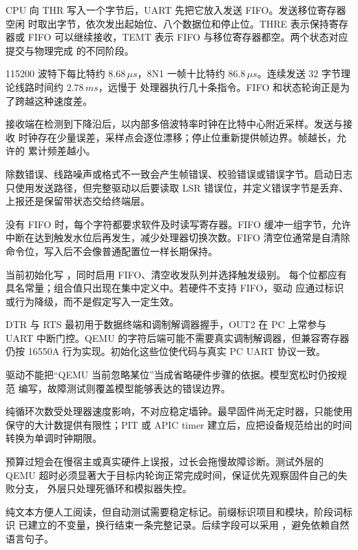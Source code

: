 
CPU 向 THR 写入一个字节后，UART 先把它放入发送 FIFO。发送移位寄存器空闲
时取出字节，依次发出起始位、八个数据位和停止位。THRE 表示保持寄存器或 FIFO
可以继续接收，TEMT 表示 FIFO 与移位寄存器都空。两个状态对应提交与物理完成
的不同阶段。

115200 波特下每比特约 \(8.68\,\mu s\)，8N1 一帧十比特约
\(86.8\,\mu s\)。连续发送 32 字节理论线路时间约 \(2.78\,ms\)，远慢于
处理器执行几十条指令。FIFO 和状态轮询正是为了跨越这种速度差。

接收端在检测到下降沿后，以内部多倍波特率时钟在比特中心附近采样。发送与接收
时钟存在少量误差，采样点会逐位漂移；停止位重新提供帧边界。帧越长，允许的
累计频差越小。

除数错误、线路噪声或格式不一致会产生帧错误、校验错误或错误字节。启动日志
只使用发送路径，但完整驱动以后要读取 LSR 错误位，并定义错误字节是丢弃、
上报还是保留带状态交给终端层。

没有 FIFO 时，每个字符都要求软件及时读写寄存器。FIFO 缓冲一组字节，允许
中断在达到触发水位后再发生，减少处理器切换次数。FIFO 清空位通常是自清除
命令位，写入后不会像普通配置位一样长期保持。

当前初始化写 ，同时启用 FIFO、清空收发队列并选择触发级别。
每个位都应有具名常量；组合值只出现在集中定义中。若硬件不支持 FIFO，驱动
应通过标识或行为降级，而不是假定写入一定生效。

DTR 与 RTS 最初用于数据终端和调制解调器握手，OUT2 在 PC 上常参与 UART
中断门控。QEMU 的字符后端可能不需要真实调制解调器，但兼容寄存器仍按
16550A 行为实现。初始化这些位使代码与真实 PC UART 协议一致。

驱动不能把“QEMU 当前忽略某位”当成省略硬件步骤的依据。模型宽松时仍按规范
编写，故障测试则覆盖模型能够表达的错误边界。

纯循环次数受处理器速度影响，不对应稳定墙钟。最早固件尚无定时器，只能使用
保守的大计数提供有限性；PIT 或 APIC timer 建立后，应把设备规范给出的时间
转换为单调时钟期限。

预算过短会在慢宿主或真实硬件上误报，过长会拖慢故障诊断。测试外层的 QEMU
超时必须显著大于目标内轮询正常完成时间，保证优先观察固件自己的失败分支，
外层只处理死循环和模拟器失控。


纯文本方便人工阅读，但自动测试需要稳定标记。前缀标识项目和模块，阶段词标识
已建立的不变量，换行结束一条完整记录。后续字段可以采用
，避免依赖自然语言句子。

